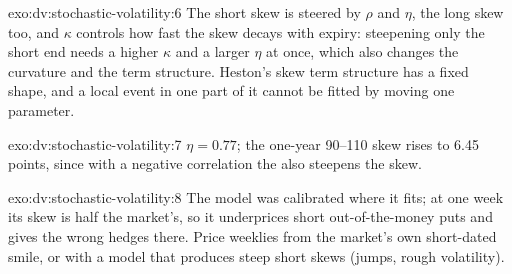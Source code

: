 \begin{solution}{exo:dv:stochastic-volatility:6}
The short skew is steered by $\rho$ and $\eta$, the long skew too, and $\kappa$ controls how fast the skew decays with
expiry: steepening only the short end needs a higher $\kappa$ and a larger $\eta$ at once, which also changes the
curvature and the term structure. Heston's skew term structure has a fixed shape, and a local event in one part of
it cannot be fitted by moving one parameter.
\end{solution}

\begin{solution}{exo:dv:stochastic-volatility:7}
$\eta=0.77$; the one-year 90--110 skew rises to 6.45 points, since with a negative correlation the  also steepens the skew.
\end{solution}

\begin{solution}{exo:dv:stochastic-volatility:8}
The model was calibrated where it fits; at one week its skew is half the market's, so it underprices short
out-of-the-money puts and gives the wrong hedges there. Price weeklies from the market's own short-dated smile, or
with a model that produces steep short skews (jumps, rough volatility).
\end{solution}

